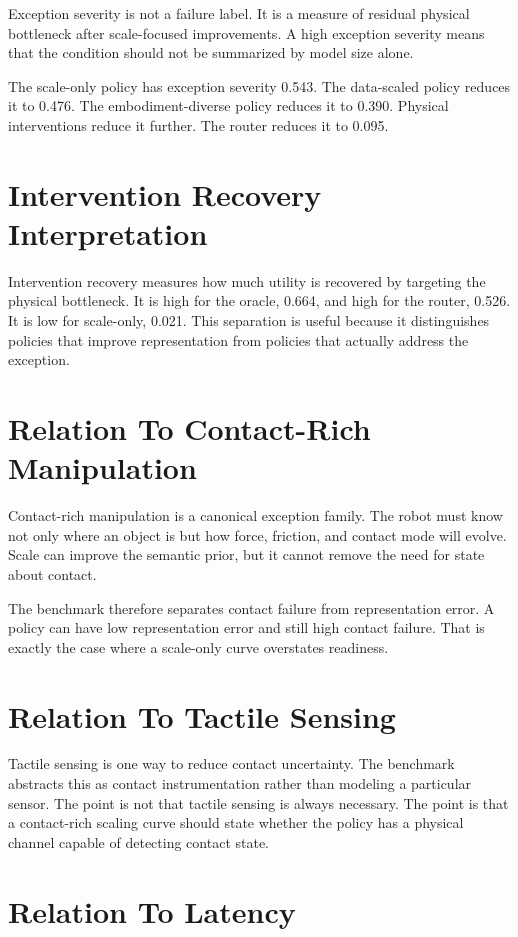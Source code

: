 Exception severity is not a failure label. It is a measure of residual physical bottleneck after scale-focused improvements. A high exception severity means that the condition should not be summarized by model size alone.

The scale-only policy has exception severity 0.543. The data-scaled policy reduces it to 0.476. The embodiment-diverse policy reduces it to 0.390. Physical interventions reduce it further. The router reduces it to 0.095.

\section{Intervention Recovery Interpretation}

Intervention recovery measures how much utility is recovered by targeting the physical bottleneck. It is high for the oracle, 0.664, and high for the router, 0.526. It is low for scale-only, 0.021. This separation is useful because it distinguishes policies that improve representation from policies that actually address the exception.

\section{Relation To Contact-Rich Manipulation}

Contact-rich manipulation is a canonical exception family. The robot must know not only where an object is but how force, friction, and contact mode will evolve. Scale can improve the semantic prior, but it cannot remove the need for state about contact.

The benchmark therefore separates contact failure from representation error. A policy can have low representation error and still high contact failure. That is exactly the case where a scale-only curve overstates readiness.

\section{Relation To Tactile Sensing}

Tactile sensing is one way to reduce contact uncertainty. The benchmark abstracts this as contact instrumentation rather than modeling a particular sensor. The point is not that tactile sensing is always necessary. The point is that a contact-rich scaling curve should state whether the policy has a physical channel capable of detecting contact state.

\section{Relation To Latency}

